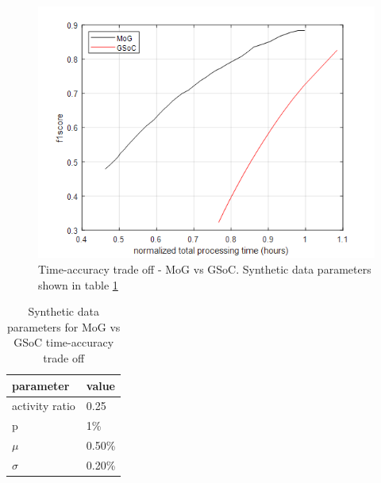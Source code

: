 \begin{figure}
    \centering
    \includegraphics[width=\linewidth]{images/time-acc-tradeoff-mog_vs_gsoc.png}
    \caption[Time-accuracy trade off - MoG vs GSoC]{Time-accuracy trade off - MoG vs GSoC. Synthetic data parameters shown in table \ref{table:fig1_data_params}}
    \label{fig:time-acc-tradeoff-mog_vs_gsoc}
\end{figure}

\begin{table}
\centering
\label{table:fig1_data_params}
\caption{Synthetic data parameters for MoG vs GSoC time-accuracy trade off} \vspace{5pt}
\begin{tabular}{|l|l|}
\hline
parameter             & value  \\ \hline \hline
activity ratio        & 0.25   \\
p                     & 1\%    \\ 
$\mu$    & 0.50\% \\ 
$\sigma$ & 0.20\% \\ \hline
\end{tabular}
\end{table}

